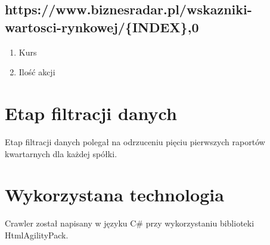 \subsection{https://www.biznesradar.pl/wskazniki-wartosci-rynkowej/\{INDEX\},0}
\begin{enumerate}
\item Kurs
\item Ilość akcji
\end{enumerate}

\section{Etap filtracji danych}
Etap filtracji danych polegał na odrzuceniu pięciu pierwszych raportów kwartarnych dla każdej spółki.

\section{Wykorzystana technologia}
Crawler został napisany w języku C\# przy wykorzystaniu biblioteki HtmlAgilityPack.
